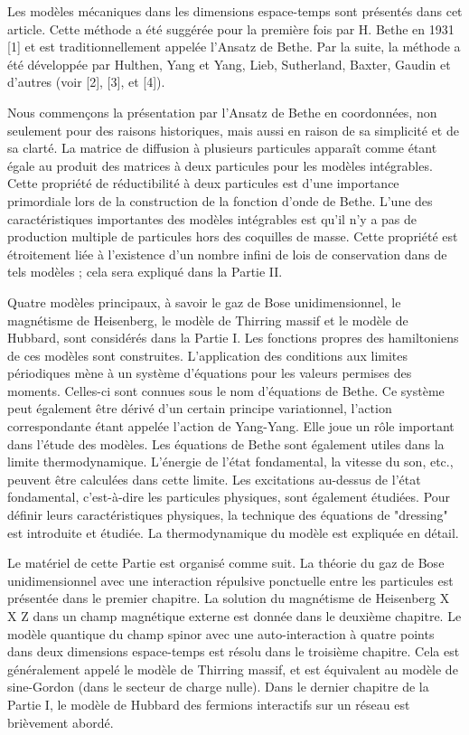 Les modèles mécaniques dans les dimensions espace-temps sont présentés dans cet article. Cette méthode a été suggérée pour la première fois par H. Bethe en 1931 [1] et est traditionnellement appelée l'Ansatz de Bethe. Par la suite, la méthode a été développée par Hulthen, Yang et Yang, Lieb, Sutherland, Baxter, Gaudin et d'autres (voir [2], [3], et [4]).

Nous commençons la présentation par l'Ansatz de Bethe en coordonnées, non seulement pour des raisons historiques, mais aussi en raison de sa simplicité et de sa clarté. {\color{red} La matrice de diffusion à plusieurs particules apparaît comme étant égale au produit des matrices à deux particules pour les modèles intégrables. Cette propriété de réductibilité à deux particules est d'une importance primordiale lors de la construction de la fonction d'onde de Bethe. L'une des caractéristiques importantes des modèles intégrables est qu'il n'y a pas de production multiple de particules hors des coquilles de masse. Cette propriété est étroitement liée à l'existence d'un nombre infini de lois de conservation dans de tels modèles ; cela sera expliqué dans la Partie II.}

Quatre modèles principaux, à savoir le gaz de Bose unidimensionnel, le magnétisme de Heisenberg, le modèle de Thirring massif et le modèle de Hubbard, sont considérés dans la Partie I. Les fonctions propres des hamiltoniens de ces modèles sont construites. {\color{red} L'application des conditions aux limites périodiques mène à un système d'équations pour les valeurs permises des moments. Celles-ci sont connues sous le nom d'équations de Bethe. Ce système peut également être dérivé d'un certain principe variationnel, l'action correspondante étant appelée l'action de Yang-Yang. Elle joue un rôle important dans l'étude des modèles. Les équations de Bethe sont également utiles dans la limite thermodynamique. L'énergie de l'état fondamental, la vitesse du son, etc., peuvent être calculées dans cette limite. Les excitations au-dessus de l'état fondamental, c'est-à-dire les particules physiques, sont également étudiées. Pour définir leurs caractéristiques physiques, la technique des équations de "dressing" est introduite et étudiée. La thermodynamique du modèle est expliquée en détail.}

Le matériel de cette Partie est organisé comme suit. La théorie du gaz de Bose unidimensionnel avec une interaction répulsive ponctuelle entre les particules est présentée dans le premier chapitre. La solution du magnétisme de Heisenberg X X Z dans un champ magnétique externe est donnée dans le deuxième chapitre. Le modèle quantique du champ spinor avec une auto-interaction à quatre points dans deux dimensions espace-temps est résolu dans le troisième chapitre. Cela est généralement appelé le modèle de Thirring massif, et est équivalent au modèle de sine-Gordon (dans le secteur de charge nulle). Dans le dernier chapitre de la Partie I, le modèle de Hubbard des fermions interactifs sur un réseau est brièvement abordé.


